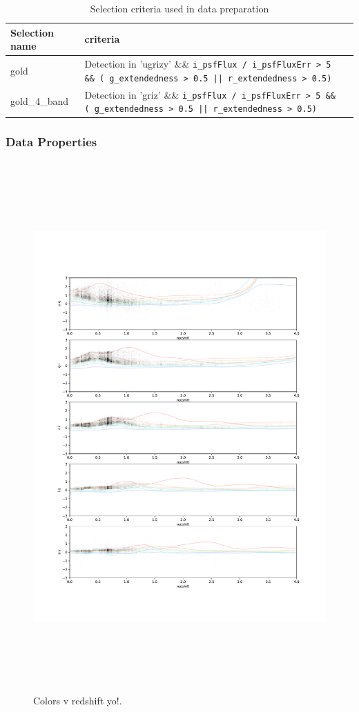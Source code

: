 \begin{table}
\centering
\begin{tabular}{lll}
 \hline
    Selection name & criteria\\
 \hline
 \hline
  gold & Detection in 'ugrizy' \&\& \texttt{i\_psfFlux / i\_psfFluxErr > 5 \&\& ( g\_extendedness > 0.5 || r\_extendedness > 0.5)} \\
  gold\_4\_band & Detection in 'griz' \&\& \texttt{i\_psfFlux / i\_psfFluxErr > 5 \&\& ( g\_extendedness > 0.5 || r\_extendedness > 0.5)}  \\
 \hline
\end{tabular}
\caption{Selection criteria used in data preparation}
\label{tab:selection}
\end{table}

\subsubsection{Data Properties}
\label{sec:data:dp1:properties}


\begin{figure}
    \centering
    \includegraphics[height=8in]{figures/color_v_redshift.pdf}
    \caption{Colors v redshift yo!.}
    \label{fig:dp_color_v_redshift}
\end{figure}


